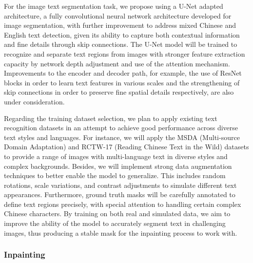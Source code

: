 \documentclass[10pt,twocolumn,letterpaper]{article}
\begin{document}

For the image text segmentation task, we propose using a U-Net adapted architecture, a fully convolutional neural network architecture developed for image segmentation, with further improvement to address mixed Chinese and English text detection, given its ability to capture both contextual information and fine details through skip connections. 
The U-Net model will be trained to recognize and separate text regions from images with stronger feature extraction capacity by network depth adjustment and use of the attention mechanism. Improvements to the encoder and decoder path, for example, the use of ResNet blocks in order to learn text features in various scales and the strengthening of skip connections in order to preserve fine spatial details respectively, are also under consideration.

Regarding the training dataset selection, we plan to apply existing text recognition datasets in an attempt to achieve good performance across diverse text styles and languages. For instance, we will apply the MSDA (Multi-source Domain Adaptation) and RCTW-17 (Reading Chinese Text in the Wild) datasets to provide a range of images with multi-language text in diverse styles and complex backgrounds. 
Besides, we will implement strong data augmentation techniques to better enable the model to generalize. This includes random rotations, scale variations, and contrast adjustments to simulate different text appearances. Furthermore, ground truth masks will be carefully annotated to define text regions precisely, with special attention to handling certain complex Chinese characters.
By training on both real and simulated data, we aim to improve the ability of the model to accurately segment text in challenging images, thus producing a stable mask for the inpainting process to work with.

\subsubsection{Inpainting}

\end{document}
